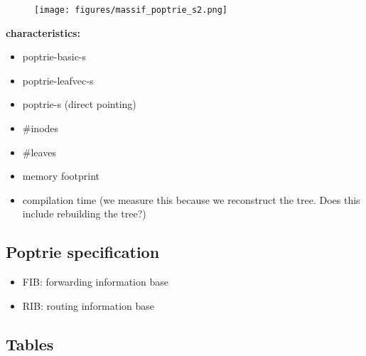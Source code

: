 \documentclass{article}
\begin{document}
\begin{figure}
\begin{center}
    \texttt{[image: figures/massif\_poptrie\_s2.png]}
\end{center}
\end{figure}
\textbf{characteristics:}
\begin{itemize}
    \item poptrie-basic-s
    \item poptrie-leafvec-s
    \item poptrie-s (direct pointing)
    \item \#inodes
    \item \#leaves
    \item memory footprint
    \item compilation time (we measure this because
    we reconstruct the tree. Does this include rebuilding the tree?)
\end{itemize}

\subsection{Poptrie specification}
\begin{itemize}
    \item FIB: forwarding information base
    \item RIB: routing information base
\end{itemize}

\newpage
\subsection{Tables}
\end{document}
